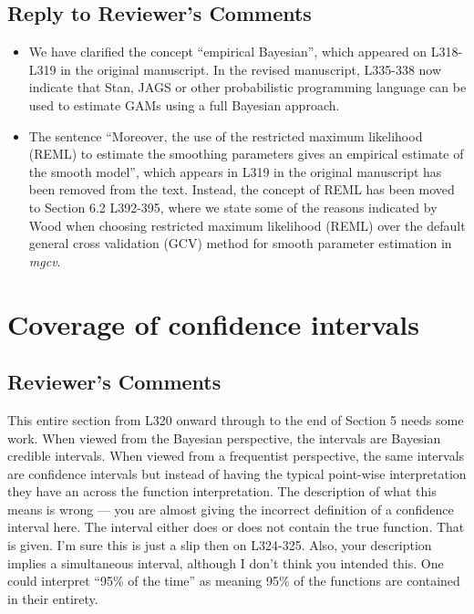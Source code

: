\documentclass[
]{article}
\begin{document}
\hypertarget{section-5}{%
\subsection{\texorpdfstring{\textcolor{reviewersblue} {Reply to Reviewer's Comments}}{}}\label{section-5}}

\begin{itemize}
\item
  We have clarified the concept ``empirical Bayesian'', which appeared on L318-L319 in the original manuscript. In the revised manuscript, L335-338 now indicate that Stan, JAGS or other probabilistic programming language can be used to estimate GAMs using a full Bayesian approach.
\item
  The sentence ``Moreover, the use of the restricted maximum likelihood (REML) to estimate the smoothing parameters gives an empirical estimate of the smooth model'', which appears in L319 in the original manuscript has been removed from the text. Instead, the concept of REML has been moved to Section 6.2 L392-395, where we state some of the reasons indicated by Wood when choosing restricted maximum likelihood (REML) over the default general cross validation (GCV) method for smooth parameter estimation in \emph{mgcv}.
\end{itemize}

\hypertarget{coverage-of-confidence-intervals}{%
\section{Coverage of confidence intervals}\label{coverage-of-confidence-intervals}}

\hypertarget{reviewers-comments-6}{%
\subsection{Reviewer's Comments}\label{reviewers-comments-6}}

This entire section from L320 onward through to the end of Section 5 needs some work. When viewed from the Bayesian perspective, the intervals are Bayesian credible intervals. When viewed from a frequentist perspective, the same intervals are confidence intervals but instead of having the typical point-wise interpretation they have an across the function interpretation.
The description of what this means is wrong --- you are almost giving the incorrect definition of a confidence interval here. The interval either does or does not contain the true function. That is given. I'm sure this is just a slip then on L324-325.
Also, your description implies a simultaneous interval, although I don't think you intended this. One could interpret ``95\% of the time'' as meaning 95\% of the functions are contained in their entirety.
\end{document}
